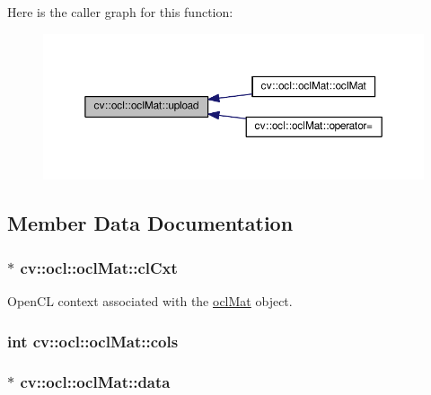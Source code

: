 Here is the caller graph for this function\-:\nopagebreak
\begin{figure}[H]
\begin{center}
\leavevmode
\includegraphics[width=350pt]{classcv_1_1ocl_1_1oclMat_ab117cd9e6b8e6b63571f3cdea44e2277_icgraph}
\end{center}
\end{figure}




\subsection{Member Data Documentation}
\hypertarget{classcv_1_1ocl_1_1oclMat_acf2c7fa26f7668778ca9ef1fb7f1e7cb}{
\subsubsection[{cl\-Cxt}]{$\ast$ cv\-::ocl\-::ocl\-Mat\-::cl\-Cxt}}\label{classcv_1_1ocl_1_1oclMat_acf2c7fa26f7668778ca9ef1fb7f1e7cb}


Open\-C\-L context associated with the \hyperlink{classcv_1_1ocl_1_1oclMat}{ocl\-Mat} object. 

\hypertarget{classcv_1_1ocl_1_1oclMat_ac814acb1fd2613d43e5fbb9c2166ac9f}{
\subsubsection[{cols}]{\setlength{\rightskip}{0pt plus 5cm}int cv\-::ocl\-::ocl\-Mat\-::cols}}\label{classcv_1_1ocl_1_1oclMat_ac814acb1fd2613d43e5fbb9c2166ac9f}
\hypertarget{classcv_1_1ocl_1_1oclMat_a9eeb429cbc7aca93239988592a40aac5}{
\subsubsection[{data}]{$\ast$ cv\-::ocl\-::ocl\-Mat\-::data}}\label{classcv_1_1ocl_1_1oclMat_a9eeb429cbc7aca93239988592a40aac5}


